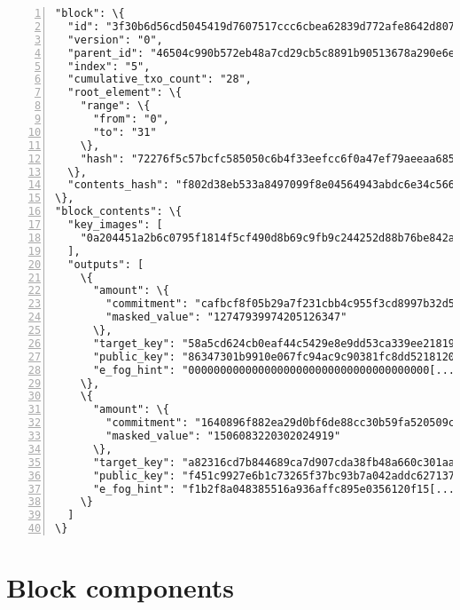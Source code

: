 \begin{appendices}
\begin{Verbatim}[commandchars=\\\{\}, numbers=left]
"block": \{
  "id": "3f30b6d56cd5045419d7607517ccc6cbea62839d772afe8642d8075072cf7f11",
  "version": "0",
  "parent_id": "46504c990b572eb48a7cd29cb5c8891b90513678a290e6e7235ab8947644182a",
  "index": "5",
  "cumulative_txo_count": "28",
  "root_element": \{
    "range": \{
      "from": "0",
      "to": "31"
    \},
    "hash": "72276f5c57bcfc585050c6b4f33eefcc6f0a47ef79aeeaa68593af608108b7e9"
  \},
  "contents_hash": "f802d38eb533a8497099f8e04564943abdc6e34c566c2045bbeaa46e0ad170b4"
\},
"block_contents": \{
  "key_images": [
    "0a204451a2b6c0795f1814f5cf490d8b69c9fb9c244252d88b76be842ab1ec4ca22e"
  ],
  "outputs": [
    \{
      "amount": \{
        "commitment": "cafbcf8f05b29a7f231cbb4c955f3cd8997b32d50758ceda2de3591c314d083f",
        "masked_value": "12747939974205126347"
      \},
      "target_key": "58a5cd624cb0eaf44c5429e8e9dd53ca339ee21819847fe0f09307c1bd7a6e3e",
      "public_key": "86347301b9910e067fc94ac9c90381fc8dd521812006af48440fbd9f64eeea20",
      "e_fog_hint": "00000000000000000000000000000000000000[...]000000000000000000000"
    \},
    \{
      "amount": \{
        "commitment": "1640896f882ea29d0bf6de88cc30b59fa520509c3905e5a8a55cefdde7e52f55",
        "masked_value": "1506083220302024919"
      \},
      "target_key": "a82316cd7b844689ca7d907cda38fb48a660c301aaee3a277791a11a34e56772",
      "public_key": "f451c9927e6b1c73265f37bc93b7a042addc627137ab1082d8f42b88b2917a6f",
      "e_fog_hint": "f1b2f8a048385516a936affc895e0356120f15[...]765c36adaae2981910100"
    \}
  ]
\}
\end{Verbatim}



\section*{Block components}


\end{appendices}

